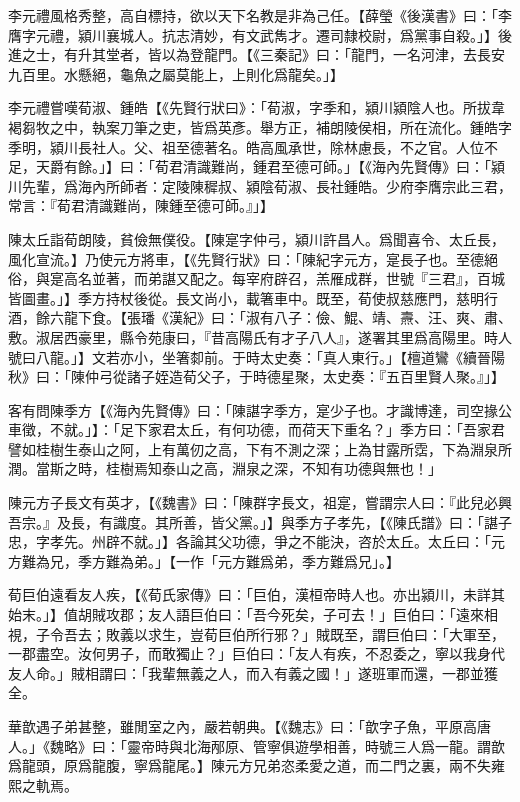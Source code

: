 李元禮風格秀整，高自標持，欲以天下名教是非為己任。【薛瑩《後漢書》曰：「李膺字元禮，潁川襄城人。抗志清妙，有文武雋才。遷司隸校尉，爲黨事自殺。」】後進之士，有升其堂者，皆以為登龍門。【《三秦記》曰：「龍門，⼀名河津，去長安九百里。水懸絕，龜魚之屬莫能上，上則化爲龍矣。」】

李元禮嘗嘆荀淑、鍾皓【《先賢行狀曰》：「荀淑，字季和，潁川潁陰人也。所拔韋褐芻牧之中，執案刀筆之吏，皆爲英彥。舉方正，補朗陵侯相，所在流化。鍾皓字季明，潁川長社人。父、祖至德著名。皓高風承世，除林慮長，不之官。人位不足，天爵有餘。」】曰：「荀君清識難尚，鍾君至德可師。」【《海內先賢傳》曰：「潁川先輩，爲海內所師者：定陵陳穉叔、潁陰荀淑、長社鍾皓。少府李膺宗此三君，常言：『荀君清識難尚，陳鍾至德可師。』」】

陳太丘詣荀朗陵，貧儉無僕役。【陳寔字仲弓，潁川許昌人。爲聞喜令、太丘長，風化宣流。】乃使元方將車，【《先賢行狀》曰：「陳紀字元方，寔長子也。至德絕俗，與寔高名並著，而弟諶又配之。每宰府辟召，羔雁成群，世號『三君』，百城皆圖畫。」】季方持杖後從。長文尚小，載箸車中。既至，荀使叔慈應門，慈明行酒，餘六龍下食。【張璠《漢紀》曰：「淑有八子：儉、鯤、靖、燾、汪、爽、肅、敷。淑居西豪里，縣令苑康曰，『昔高陽氏有才子八人』，遂署其里爲高陽里。時人號曰八龍。」】文若亦小，坐箸厀前。于時太史奏：「真人東行。」【檀道鸞《續晉陽秋》曰：「陳仲弓從諸子姪造荀父子，于時德星聚，太史奏：『五百里賢人聚。』」】

客有問陳季方【《海內先賢傳》曰：「陳諶字季方，寔少子也。才識博達，司空掾公車徵，不就。」】：「足下家君太丘，有何功德，而荷天下重名？」季方曰：「吾家君譬如桂樹生泰山之阿，上有萬仞之高，下有不測之深；上為甘露所霑，下為淵泉所潤。當斯之時，桂樹焉知泰山之高，淵泉之深，不知有功德與無也！」

陳元方子長文有英才，【《魏書》曰：「陳群字長文，祖寔，嘗謂宗人曰：『此兒必興吾宗。』及長，有識度。其所善，皆父黨。」】與季方子孝先，【《陳氏譜》曰：「諶子忠，字孝先。州辟不就。」】各論其父功德，爭之不能決，咨於太丘。太丘曰：「元方難為兄，季方難為弟。」【⼀作「元方難爲弟，季方難爲兄」。】

荀巨伯遠看友人疾，【《荀氏家傳》曰：「巨伯，漢桓帝時人也。亦出潁川，未詳其始末。」】值胡賊攻郡；友人語巨伯曰：「吾今死矣，子可去！」巨伯曰：「遠來相視，子令吾去；敗義以求生，豈荀巨伯所行邪？」賊既至，謂巨伯曰：「大軍至，一郡盡空。汝何男子，而敢獨止？」巨伯曰：「友人有疾，不忍委之，寧以我身代友人命。」賊相謂曰：「我輩無義之人，而入有義之國！」遂班軍而還，一郡並獲全。

華歆遇子弟甚整，雖閒室之內，嚴若朝典。【《魏志》曰：「歆字子魚，平原高唐人。」《魏略》曰：「靈帝時與北海邴原、管寧俱遊學相善，時號三人爲⼀龍。謂歆爲龍頭，原爲龍腹，寧爲龍尾。】陳元方兄弟恣柔愛之道，而二門之裏，兩不失雍熙之軌焉。

